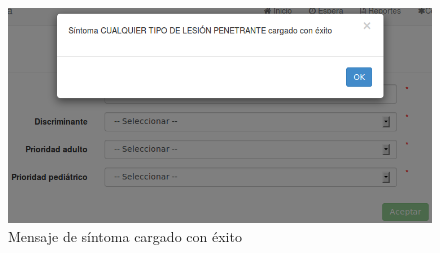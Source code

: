 \begin{figure}
\centerline{\includegraphics[width=1\textwidth]{sintoma_cargado_con_exito.png}}
\caption{Mensaje de síntoma cargado con éxito}
\label{fig:sintoma_cargado_con_exito}
\end{figure}

